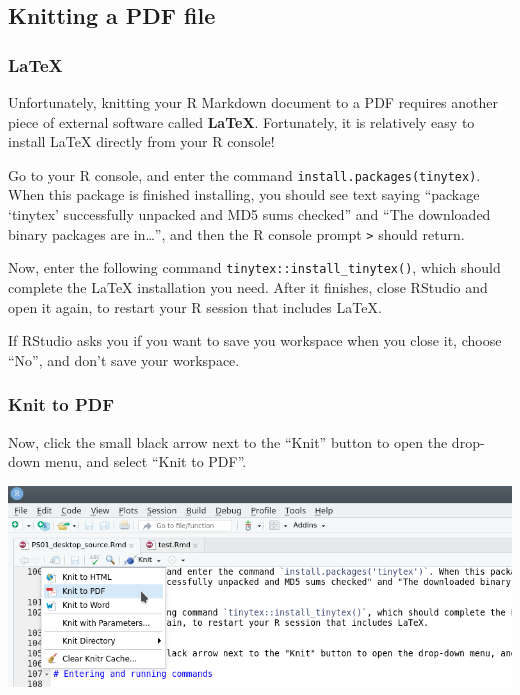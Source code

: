 \documentclass[
]{article}
\begin{document}
\hypertarget{knitting-a-pdf-file}{%
\subsection{Knitting a PDF file}\label{knitting-a-pdf-file}}

\hypertarget{latex}{%
\subsubsection{LaTeX}\label{latex}}

Unfortunately, knitting your R Markdown document to a PDF requires
another piece of external software called \textbf{LaTeX}. Fortunately,
it is relatively easy to install LaTeX directly from your R console!

Go to your R console, and enter the command
\texttt{install.packages(\textquotesingle{}tinytex\textquotesingle{})}.
When this package is finished installing, you should see text saying
``package `tinytex' successfully unpacked and MD5 sums checked'' and
``The downloaded binary packages are in\ldots{}'', and then the R
console prompt \texttt{\textgreater{}} should return.

Now, enter the following command \texttt{tinytex::install\_tinytex()},
which should complete the LaTeX installation you need. After it
finishes, close RStudio and open it again, to restart your R session
that includes LaTeX.

\leavevmode\hypertarget{license}{}%
If RStudio asks you if you want to save you workspace when you close it,
choose ``No'', and don't save your workspace.

\hypertarget{knit-to-pdf}{%
\subsubsection{Knit to PDF}\label{knit-to-pdf}}

Now, click the small black arrow next to the ``Knit'' button to open the
drop-down menu, and select ``Knit to PDF''.

\includegraphics{figures/knit2pdf.png}
\end{document}
